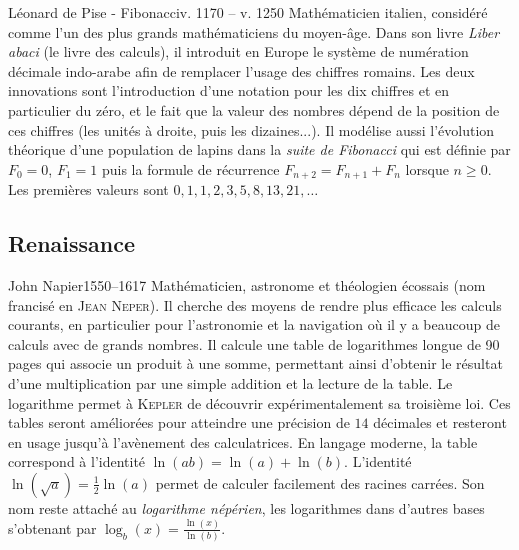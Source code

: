 \documentclass[10pt,class=article,crop=false]{standalone}
\begin{document}
\begin{multicols}{2}
\begin{biographie}{Léonard de Pise - Fibonacci}{v. 1170 -- v. 1250}
Mathématicien italien, considéré comme l'un des plus grands mathématiciens du moyen-âge.
Dans son livre \emph{Liber abaci} (le livre des calculs), il introduit en Europe le système de numération décimale indo-arabe afin de remplacer l'usage des chiffres romains. Les deux innovations sont l'introduction d'une notation pour les dix chiffres et en particulier du zéro, et le fait que la valeur des nombres dépend de la position de ces chiffres (les unités à droite, puis les dizaines...).
Il modélise aussi l’évolution théorique d’une population de lapins dans 
la \emph{suite de Fibonacci} qui est définie par $F_0=0$, $F_1=1$ puis la formule de récurrence 
$F_{n+2} = F_{n+1} + F_n$ lorsque $n \ge 0$. Les premières valeurs sont $0,1,1,2,3,5,8,13,21,\ldots$
\end{biographie}


\subsection{Renaissance}

\begin{biographie}{John Napier}{1550--1617}
Mathématicien, astronome et théologien écossais (nom francisé en \textsc{Jean Neper}).
Il cherche des moyens de rendre plus efficace les calculs courants, en particulier pour l'astronomie et la navigation où il y a beaucoup de calculs avec de grands nombres.
Il calcule une table de logarithmes longue de 90 pages qui associe un produit à une somme, permettant ainsi d'obtenir le résultat d'une multiplication par une simple addition et la lecture de la table. 
Le logarithme permet à \textsc{Kepler} de découvrir expérimentalement sa troisième loi. Ces tables seront améliorées pour atteindre une précision de $14$ décimales et resteront en usage jusqu'à l'avènement des calculatrices. En langage moderne, la table correspond à l'identité $\ln(ab) = \ln(a) + \ln(b)$. L'identité $\ln(\sqrt{a}) = \frac12\ln(a)$ permet de calculer facilement des racines carrées. 
 Son nom reste attaché au \emph{logarithme népérien}, les logarithmes dans d'autres bases s'obtenant par $\log_b(x) = \frac{\ln(x)}{\ln(b)}$.
\end{biographie}



\end{multicols}
\end{document}
